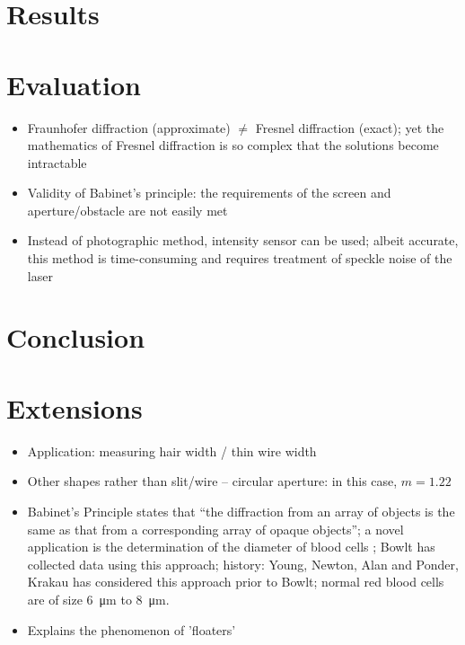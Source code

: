 \documentclass[a4paper, 12pt]{article}
\begin{document}
\section*{Results}

\section*{Evaluation}
\begin{itemize}
\itemsep 0em
    \item Fraunhofer diffraction (approximate) $\neq$ Fresnel diffraction (exact); yet the mathematics of Fresnel diffraction is so complex that the solutions become intractable
    \item Validity of Babinet's principle: the requirements of the screen and aperture/obstacle are not easily met \cite{validity}
    \item Instead of photographic method, intensity sensor can be used; albeit accurate, this method is time-consuming and requires treatment of speckle noise of the laser
\end{itemize}

\section*{Conclusion}

\section*{Extensions}
\begin{itemize}
\itemsep 0em
    \item Application: measuring hair width / thin wire width \cite{wire_measurement}
    \item Other shapes rather than slit/wire -- circular aperture: in this case, $m = 1.22$
    \item Babinet's Principle states that ``the diffraction from an array of objects is the same as that from a corresponding array of opaque objects''; a novel application is the determination of the diameter of blood cells \cite{blood_cell}; Bowlt \cite{blood_cell_success} has collected data using this approach; history: Young, Newton, Alan and Ponder, Krakau has considered this approach prior to Bowlt; normal red blood cells are of size \SI{6}{\um} to \SI{8}{\um}.
    \item Explains the phenomenon of 'floaters'
\end{itemize}

\printbibliography
\end{document}
